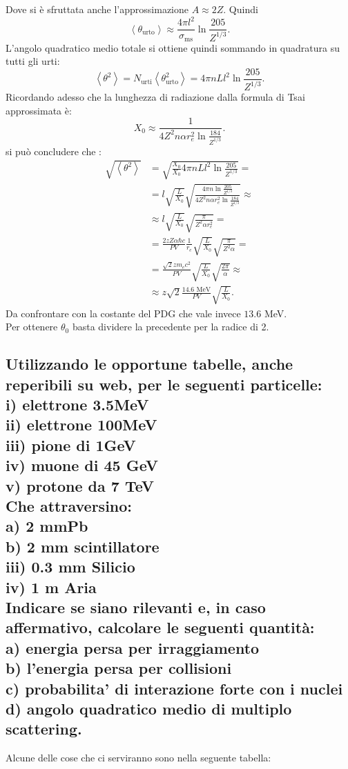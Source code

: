 Dove si è sfruttata anche l'approssimazione $A \approx 2Z$.
Quindi \[
	\left<\theta_{\text{urto}} \right> \approx \frac{4\pi l^2}{\sigma_{\text{ms}}} \ln \frac{205}{Z^{1/3}}
.\] 
L'angolo quadratico medio totale si ottiene quindi sommando in quadratura su tutti gli urti:
\[
	\left< \theta^2 \right> = N_{\text{urti}} \left<\theta^2_{\text{urto}} \right> = 4\pi nL l^2 \ln \frac{205}{Z^{1 /3}} 
.\] 
Ricordando adesso che la lunghezza di radiazione dalla formula di Tsai approssimata è:
\[
	X_0 \approx \frac{1}{4Z^2 n \alpha r_e^2 \ln \frac{184}{Z^{1 /3}}}
.\] 
si può concludere che :
\begin{align*}
	\sqrt{\left<\theta^2 \right>} &= \sqrt{\frac{X_0}{X_0} 4\pi nL l^2 \ln \frac{205}{Z^{1 /3}}} =\\
	&= l \sqrt{\frac{L}{X_0}} \sqrt{ \frac{4\pi n \ln \frac{205}{Z^{1 /3}} }{4Z^2 n \alpha r_e^2 \ln \frac{184}{Z^{1 /3}}} } \approx \\ 
	&\approx l \sqrt{\frac{L}{X_0}} \sqrt{\frac{\pi}{Z^2\alpha r_e^2}}=\\
	&= \frac{2zZ \alpha \hbar c}{PV}\frac{1}{r_e}\sqrt{\frac{L}{X_0}} \sqrt{\frac{\pi}{Z^2 \alpha}}=\\
	&= \frac{\sqrt{2} z m_e c^2}{PV} \sqrt{\frac{L}{X_0}} \sqrt{\frac{2\pi}{\alpha}} \approx \\
	&\approx z \sqrt{2} \frac{14.6 \text{ MeV}}{PV}\sqrt{\frac{L}{X_0}} 
.\end{align*}
Da confrontare con la costante del PDG che vale invece $13.6$ MeV.\\
Per ottenere $\theta_0$ basta dividere la precedente per la radice di 2.

\subsection[\hspace{1mm} Indagine di interazione con la materia per alcune particelle]{Utilizzando le opportune tabelle, anche reperibili su web, per le seguenti particelle: \\
i) elettrone 3.5MeV \\
ii) elettrone 100MeV \\
iii) pione di 1GeV \\
iv) muone di 45 GeV \\
v) protone da 7 TeV\\
Che attraversino:\\
a) 2 mmPb\\
b) 2 mm scintillatore\\
iii) 0.3 mm Silicio\\
iv) 1 m Aria\\
Indicare se siano rilevanti e, in caso affermativo, calcolare le seguenti quantità: \\
a) energia persa per irraggiamento \\
b) l’energia persa per collisioni \\
c) probabilita' di interazione forte con i nuclei\\
d) angolo quadratico medio di multiplo scattering.
}
\label{sec:4.b.19}
Alcune delle cose che ci serviranno sono nella seguente tabella:

